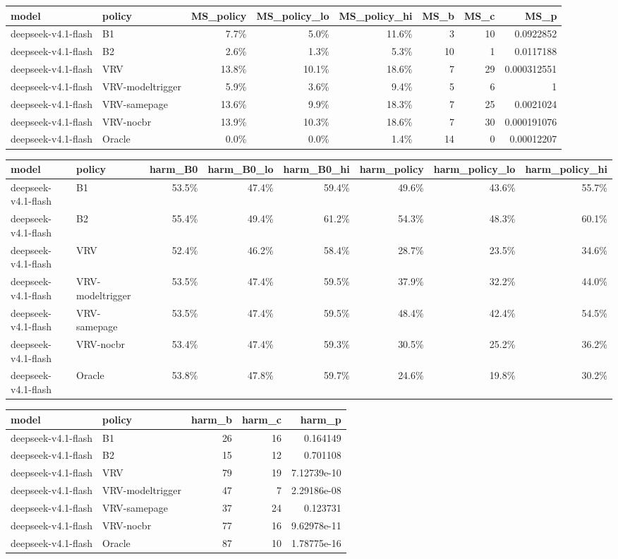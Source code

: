 \begin{tabular}{llrrrrrr}
\toprule
model & policy & MS\_policy & MS\_policy\_lo & MS\_policy\_hi & MS\_b & MS\_c & MS\_p \\
\midrule
deepseek-v4.1-flash & B1 & 7.7\% & 5.0\% & 11.6\% & 3 & 10 & 0.0922852 \\
deepseek-v4.1-flash & B2 & 2.6\% & 1.3\% & 5.3\% & 10 & 1 & 0.0117188 \\
deepseek-v4.1-flash & VRV & 13.8\% & 10.1\% & 18.6\% & 7 & 29 & 0.000312551 \\
deepseek-v4.1-flash & VRV-modeltrigger & 5.9\% & 3.6\% & 9.4\% & 5 & 6 & 1 \\
deepseek-v4.1-flash & VRV-samepage & 13.6\% & 9.9\% & 18.3\% & 7 & 25 & 0.0021024 \\
deepseek-v4.1-flash & VRV-nocbr & 13.9\% & 10.3\% & 18.6\% & 7 & 30 & 0.000191076 \\
deepseek-v4.1-flash & Oracle & 0.0\% & 0.0\% & 1.4\% & 14 & 0 & 0.00012207 \\
\bottomrule
\end{tabular}

\begin{tabular}{llrrrrrr}
\toprule
model & policy & harm\_B0 & harm\_B0\_lo & harm\_B0\_hi & harm\_policy & harm\_policy\_lo & harm\_policy\_hi \\
\midrule
deepseek-v4.1-flash & B1 & 53.5\% & 47.4\% & 59.4\% & 49.6\% & 43.6\% & 55.7\% \\
deepseek-v4.1-flash & B2 & 55.4\% & 49.4\% & 61.2\% & 54.3\% & 48.3\% & 60.1\% \\
deepseek-v4.1-flash & VRV & 52.4\% & 46.2\% & 58.4\% & 28.7\% & 23.5\% & 34.6\% \\
deepseek-v4.1-flash & VRV-modeltrigger & 53.5\% & 47.4\% & 59.5\% & 37.9\% & 32.2\% & 44.0\% \\
deepseek-v4.1-flash & VRV-samepage & 53.5\% & 47.4\% & 59.5\% & 48.4\% & 42.4\% & 54.5\% \\
deepseek-v4.1-flash & VRV-nocbr & 53.4\% & 47.4\% & 59.3\% & 30.5\% & 25.2\% & 36.2\% \\
deepseek-v4.1-flash & Oracle & 53.8\% & 47.8\% & 59.7\% & 24.6\% & 19.8\% & 30.2\% \\
\bottomrule
\end{tabular}

\begin{tabular}{llrrr}
\toprule
model & policy & harm\_b & harm\_c & harm\_p \\
\midrule
deepseek-v4.1-flash & B1 & 26 & 16 & 0.164149 \\
deepseek-v4.1-flash & B2 & 15 & 12 & 0.701108 \\
deepseek-v4.1-flash & VRV & 79 & 19 & 7.12739e-10 \\
deepseek-v4.1-flash & VRV-modeltrigger & 47 & 7 & 2.29186e-08 \\
deepseek-v4.1-flash & VRV-samepage & 37 & 24 & 0.123731 \\
deepseek-v4.1-flash & VRV-nocbr & 77 & 16 & 9.62978e-11 \\
deepseek-v4.1-flash & Oracle & 87 & 10 & 1.78775e-16 \\
\bottomrule
\end{tabular}
